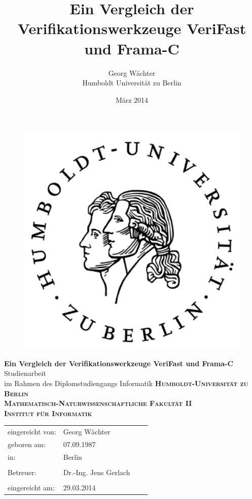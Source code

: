 \documentclass[size=A4]{scrreprt}
\title{Ein Vergleich der Verifikationswerkzeuge VeriFast und Frama-C}
\author{Georg Wächter\\Humboldt Universität zu Berlin}
\date{März 2014}
\begin{document}
\thispagestyle{empty}

\hspace{20cm}
\vspace{-2cm}

\begin{figure}[H] \hspace{11cm}
\includegraphics[width=3.2 cm]{images/HU_Logo}
\end{figure}

\begin{center}
  \vspace{0.5 cm}
  \huge{\bf Ein Vergleich der Verifikationswerkzeuge VeriFast und Frama-C} \\
  \vspace{1.5cm}
  \LARGE Studienarbeit \\
 im Rahmen des Diplomstudiengangs Informatik
  \vspace{1cm}
  \vspace{2cm}
  {\large
    \bf{
      \scshape
      Humboldt-Universit\"at zu Berlin \\
      Mathematisch-Naturwissenschaftliche Fakult\"at II \\
      Institut f\"ur Informatik\\
    }
  } 
\end{center}
\vspace {5 cm}
{\large
  \begin{tabular}{llll}
    eingereicht von:    & Georg Wächter && \\ %
    geboren am:         & 07.09.1987 && \\
    in:                 & Berlin && \\
    &&&\\
    Betreuer: & Dr.-Ing. Jens Gerlach && \\
		      
    &&&\\
    eingereicht am:     & 29.03.2014
  \end{tabular}
}

\tableofcontents







\end{document}
